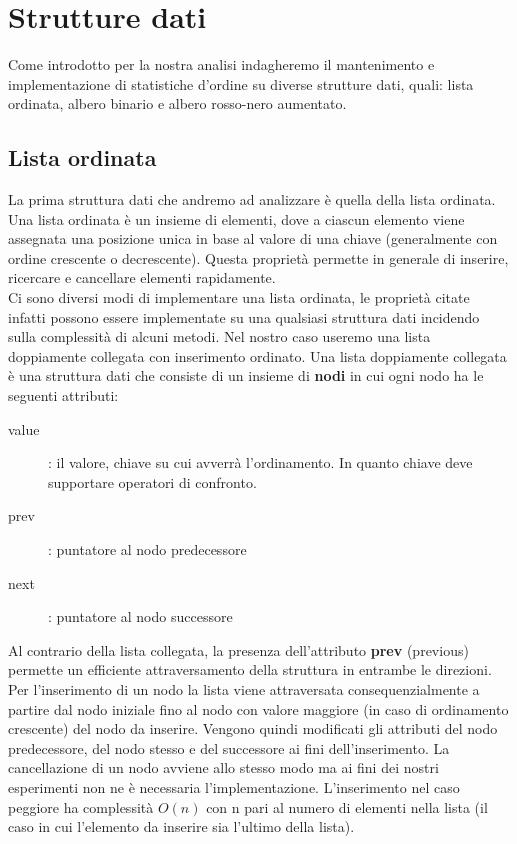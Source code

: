 \documentclass{article}
\begin{document}
\section*{Strutture dati}

Come introdotto per la nostra analisi indagheremo il mantenimento e implementazione di statistiche d'ordine su diverse strutture dati, quali: lista ordinata, albero binario e albero rosso-nero aumentato. 

\subsection*{Lista ordinata}

\noindent La prima struttura dati che andremo ad analizzare è quella della lista ordinata. Una lista ordinata è un insieme di elementi, dove a ciascun elemento viene assegnata una posizione unica in base al valore di una chiave (generalmente con ordine crescente o decrescente). Questa proprietà permette in generale di inserire, ricercare e cancellare elementi rapidamente. \\

\noindent Ci sono diversi modi di implementare una lista ordinata, le proprietà citate infatti possono essere implementate su una qualsiasi struttura dati incidendo sulla complessità di alcuni metodi. Nel nostro caso useremo una lista doppiamente collegata con inserimento ordinato. Una lista doppiamente collegata è una struttura dati che consiste di un insieme di \textbf{nodi} in cui ogni nodo ha le seguenti attributi:

\begin{description}
    \item[value]: il valore, chiave su cui avverrà l'ordinamento. In quanto chiave deve supportare operatori di confronto.
    \item[prev]: puntatore al nodo predecessore
    \item[next]: puntatore al nodo successore
\end{description} 

\noindent Al contrario della lista collegata, la presenza dell'attributo \textbf{prev} (previous) permette un efficiente attraversamento della struttura in entrambe le direzioni. Per l'inserimento di un nodo la lista viene attraversata consequenzialmente a partire dal nodo iniziale fino al nodo con valore maggiore (in caso di ordinamento crescente) del nodo da inserire. Vengono quindi modificati gli attributi del nodo predecessore, del nodo stesso e del successore ai fini dell'inserimento. La cancellazione di un nodo avviene allo stesso modo ma ai fini dei nostri esperimenti non ne è necessaria l'implementazione. L'inserimento nel caso peggiore ha complessità  $O(n)$ con n pari al numero di elementi nella lista (il caso in cui l'elemento da inserire sia l'ultimo della lista). \\
\end{document}
